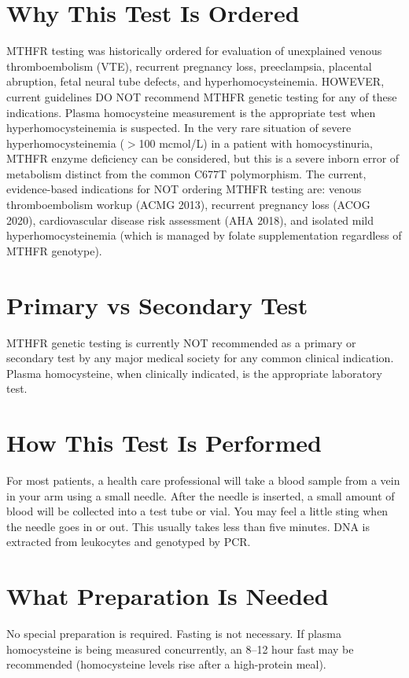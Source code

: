 \section*{Why This Test Is Ordered}
MTHFR testing was historically ordered for evaluation of unexplained venous thromboembolism (VTE), recurrent pregnancy loss, preeclampsia, placental abruption, fetal neural tube defects, and hyperhomocysteinemia. HOWEVER, current guidelines DO NOT recommend MTHFR genetic testing for any of these indications. Plasma homocysteine measurement is the appropriate test when hyperhomocysteinemia is suspected. In the very rare situation of severe hyperhomocysteinemia ($>$100 mcmol/L) in a patient with homocystinuria, MTHFR enzyme deficiency can be considered, but this is a severe inborn error of metabolism distinct from the common C677T polymorphism. The current, evidence-based indications for NOT ordering MTHFR testing are: venous thromboembolism workup (ACMG 2013), recurrent pregnancy loss (ACOG 2020), cardiovascular disease risk assessment (AHA 2018), and isolated mild hyperhomocysteinemia (which is managed by folate supplementation regardless of MTHFR genotype).

\section*{Primary vs Secondary Test}
MTHFR genetic testing is currently NOT recommended as a primary or secondary test by any major medical society for any common clinical indication. Plasma homocysteine, when clinically indicated, is the appropriate laboratory test.

\section*{How This Test Is Performed}
For most patients, a health care professional will take a blood sample from a vein in your arm using a small needle. After the needle is inserted, a small amount of blood will be collected into a test tube or vial. You may feel a little sting when the needle goes in or out. This usually takes less than five minutes. DNA is extracted from leukocytes and genotyped by PCR.

\section*{What Preparation Is Needed}
No special preparation is required. Fasting is not necessary. If plasma homocysteine is being measured concurrently, an 8--12 hour fast may be recommended (homocysteine levels rise after a high-protein meal).


